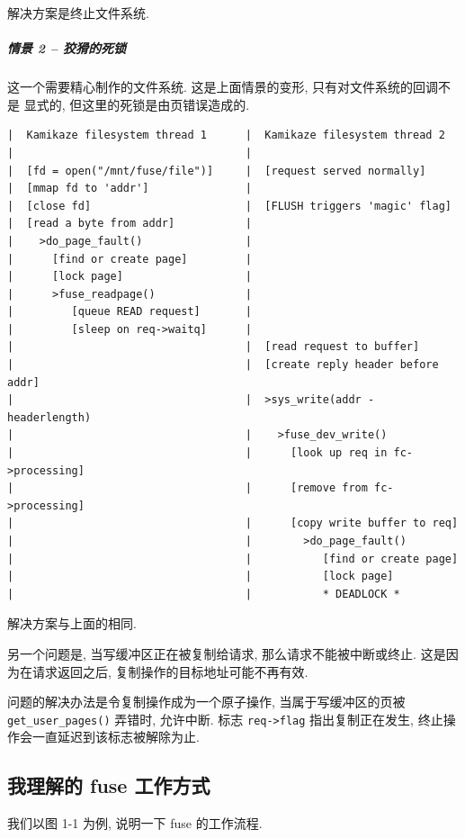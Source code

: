 \documentclass[nofonts]{ctexart}
\begin{document}
解决方案是终止文件系统.

\subparagraph{情景 2 --
狡猾的死锁}\label{ux60c5ux666f-2-ux72e1ux733eux7684ux6b7bux9501}

这一个需要精心制作的文件系统. 这是上面情景的变形,
只有对文件系统的回调不是 显式的, 但这里的死锁是由页错误造成的.

\begin{verbatim}
|  Kamikaze filesystem thread 1      |  Kamikaze filesystem thread 2
|                                    |
|  [fd = open("/mnt/fuse/file")]     |  [request served normally]
|  [mmap fd to 'addr']               |
|  [close fd]                        |  [FLUSH triggers 'magic' flag]
|  [read a byte from addr]           |
|    >do_page_fault()                |
|      [find or create page]         |
|      [lock page]                   |
|      >fuse_readpage()              |
|         [queue READ request]       |
|         [sleep on req->waitq]      |
|                                    |  [read request to buffer]
|                                    |  [create reply header before addr]
|                                    |  >sys_write(addr - headerlength)
|                                    |    >fuse_dev_write()
|                                    |      [look up req in fc->processing]
|                                    |      [remove from fc->processing]
|                                    |      [copy write buffer to req]
|                                    |        >do_page_fault()
|                                    |           [find or create page]
|                                    |           [lock page]
|                                    |           * DEADLOCK *
\end{verbatim}

解决方案与上面的相同.

另一个问题是, 当写缓冲区正在被复制给请求, 那么请求不能被中断或终止.
这是因 为在请求返回之后, 复制操作的目标地址可能不再有效.

问题的解决办法是令复制操作成为一个原子操作, 当属于写缓冲区的页被
\texttt{get\_user\_pages()} 弄错时, 允许中断. 标志
\texttt{req-\textgreater{}flag} 指出复制正在发生,
终止操作会一直延迟到该标志被解除为止.

\subsection{我理解的 fuse
工作方式}\label{ux6211ux7406ux89e3ux7684-fuse-ux5de5ux4f5cux65b9ux5f0f}

我们以图 1-1 为例, 说明一下 fuse 的工作流程.
\end{document}

